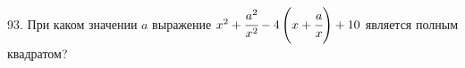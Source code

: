 93. При каком значении $a$ выражение $x^2+\cfrac{a^2}{x^2}-4\left(x+\cfrac{a}{x}\right)+10$ является полным квадратом?\\
